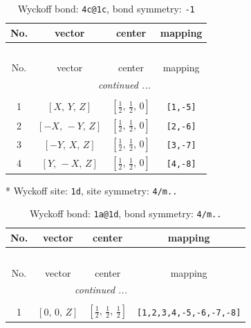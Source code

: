 \documentclass[fleqn,8pt]{jsarticle}
\begin{document}
\begin{longtable}{cccc}
\caption{Wyckoff bond: {\tt 4c@1c}, bond symmetry: {\tt -1}}
 \\
 \hline \hline
No. & vector & center & mapping \\ \hline \endfirsthead

\multicolumn{3}{l}{\tablename\ \thetable{}} \\
 \hline \hline
No. & vector & center & mapping \\ \hline \endhead

 \hline \hline
\multicolumn{3}{r}{\footnotesize\it continued ...} \\ \endfoot

 \hline \hline
\multicolumn{3}{r}{} \\ \endlastfoot

1 & $\left[ X,\, Y,\, Z \right]$ & $\left[ \frac{1}{2},\, \frac{1}{2},\, 0 \right]$ & {\tt [1,-5]} \\ \hline
2 & $\left[ - X,\, - Y,\, Z \right]$ & $\left[ \frac{1}{2},\, \frac{1}{2},\, 0 \right]$ & {\tt [2,-6]} \\ \hline
3 & $\left[ - Y,\, X,\, Z \right]$ & $\left[ \frac{1}{2},\, \frac{1}{2},\, 0 \right]$ & {\tt [3,-7]} \\ \hline
4 & $\left[ Y,\, - X,\, Z \right]$ & $\left[ \frac{1}{2},\, \frac{1}{2},\, 0 \right]$ & {\tt [4,-8]} \\
\end{longtable}
* Wyckoff site: {\tt 1d}, site symmetry: {\tt 4/m..}
\renewcommand{\arraystretch}{1.2}
\begin{longtable}{cccc}
\caption{Wyckoff bond: {\tt 1a@1d}, bond symmetry: {\tt 4/m..}}
 \\
 \hline \hline
No. & vector & center & mapping \\ \hline \endfirsthead

\multicolumn{3}{l}{\tablename\ \thetable{}} \\
 \hline \hline
No. & vector & center & mapping \\ \hline \endhead

 \hline \hline
\multicolumn{3}{r}{\footnotesize\it continued ...} \\ \endfoot

 \hline \hline
\multicolumn{3}{r}{} \\ \endlastfoot

1 & $\left[ 0,\, 0,\, Z \right]$ & $\left[ \frac{1}{2},\, \frac{1}{2},\, \frac{1}{2} \right]$ & {\tt [1,2,3,4,-5,-6,-7,-8]} \\
\end{longtable}
\end{document}
